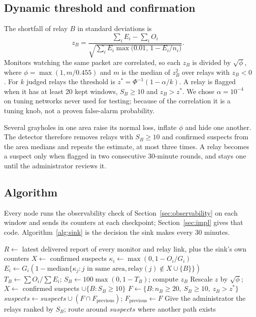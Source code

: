 \documentclass{article}
\begin{document}
\subsection{Dynamic threshold and confirmation}\label{sec:decision}
\noindent
The shortfall of relay $B$ in standard deviations is
\begin{equation}
z_B = \frac{\sum_i E_i - \sum_i O_i}{\sqrt{\sum_i E_i \max\bigl(0.01,\, 1-E_i/n_i\bigr)}}.
\end{equation}
Monitors watching the same packet are correlated, so each $z_B$ is divided by $\sqrt{\phi}$, where $\phi = \max(1, m/0.455)$ and $m$ is the median of $z_B^2$ over relays with $z_B<0$. For $k$ judged relays the threshold is $z^* = \Phi^{-1}(1-\alpha/k)$. A relay is flagged when it has at least 20 kept windows, $S_B \geq 10$ and $z_B > z^*$. We chose $\alpha = 10^{-4}$ on tuning networks never used for testing; because of the correlation it is a tuning knob, not a proven false-alarm probability.

Several grayholes in one area raise its normal loss, inflate $\phi$ and hide one another. The detector therefore removes relays with $S_B \geq 10$ and confirmed suspects from the area medians and repeats the estimate, at most three times. A relay becomes a suspect only when flagged in two consecutive 30-minute rounds, and stays one until the administrator reviews it.

\subsection{Algorithm}\label{sec:algo}
\noindent
Every node runs the observability check of Section~\ref{sec:observability} on each window and sends its counters at each checkpoint; Section~\ref{sec:impl} gives that code. Algorithm~\ref{alg:sink} is the decision the sink makes every 30 minutes.

\begin{algorithm}[htbp]
\small
\caption{Decision at the sink (every 30 min)}\label{alg:sink}
\begin{algorithmic}[1]
\State $R \gets$ latest delivered report of every monitor and relay link, plus the sink's own counters
\State $X \gets$ confirmed suspects
\Repeat {}
   \State $\kappa_i \gets \max(0, 1-O_i/G_i)$ \EndFor
    \State $E_i \gets G_i(1 - \mathrm{median}\{\kappa_j : j \text{ in same area}, \text{relay}(j) \notin X \cup \{B\}\})$
    \State $T_B \gets \sum O_i / \sum E_i$; \; $S_B \gets 100\max(0, 1-T_B)$; \; compute $z_B$
  \EndFor
  \State Rescale $z$ by $\sqrt{\phi}$; \; $X \gets$ confirmed suspects $\cup \{B : S_B \geq 10\}$
\State $F \gets \{B : n_B \geq 20,\ S_B \geq 10,\ z_B > z^*\}$
\State $\mathit{suspects} \gets \mathit{suspects} \cup (F \cap F_{\mathrm{previous}})$; \; $F_{\mathrm{previous}} \gets F$
\State Give the administrator the relays ranked by $S_B$; route around $\mathit{suspects}$ where another path exists
\end{algorithmic}
\end{algorithm}
\end{document}
